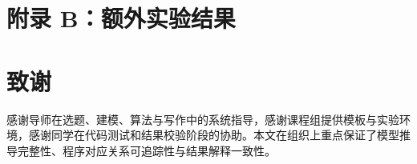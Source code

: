 \documentclass[openany]{./MathematicalModelCaseStudyReport}
\let\cleardoublepage\clearpage
\numberwithin{algorithm}{chapter}
\begin{document}
\clearpage{\pagestyle{empty}\cleardoublepage}
\chapter*{附录 B：额外实验结果}


\clearpage{\pagestyle{empty}\cleardoublepage}
\chapter*{致谢}
感谢导师在选题、建模、算法与写作中的系统指导，感谢课程组提供模板与实验环境，感谢同学在代码测试和结果校验阶段的协助。本文在组织上重点保证了模型推导完整性、程序对应关系可追踪性与结果解释一致性。
\end{document}
